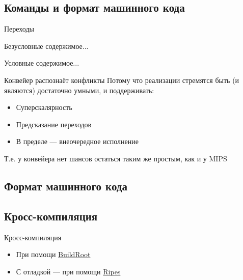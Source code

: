 \documentclass[xetex,aspectratio=43]{beamer}
\begin{document}
\subsection{Команды и формат машинного кода}

\begin{frame}{Переходы}
    \begin{block}{Безусловные}
        содержимое...
    \end{block}
    \begin{block}{Условные}
        содержимое...
    \end{block}
    \pause
    \begin{block}{Конвейер распознаёт конфликты}
        Потому что реализации стремятся быть (и являются) достаточно умными, и поддерживать:
        \begin{itemize}
            \tightlist
            \item Суперскалярность
            \item Предсказание переходов
            \item В пределе --- внеочередное исполнение
        \end{itemize}
        Т.е. у конвейера нет шансов остаться таким же простым, как и у MIPS
    \end{block}
\end{frame}

\subsection{Формат машинного кода}

\subsection{Кросс-компиляция}

\begin{frame}{Кросс-компиляция}
    \begin{itemize}
        \item При помощи \href{https://buildroot.org/}{BuildRoot}
        \item С отладкой — при помощи \href{http://ripes.me/Ripes/}{Ripes} %
    \end{itemize}
\end{frame}


\section*{}
\end{document}
